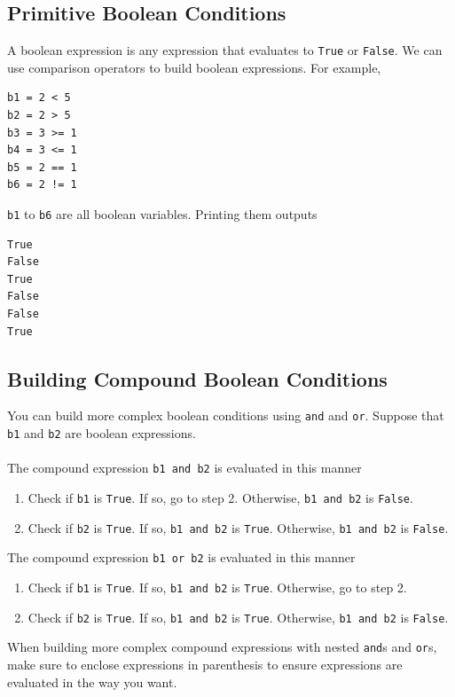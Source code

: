 \documentclass{article}
\begin{document}
\subsection{Primitive Boolean Conditions}
A boolean expression is any expression that evaluates to \texttt{True} or \texttt{\texttt{False}}. We can use comparison operators to build boolean expressions. For example, 
\begin{verbatim}
b1 = 2 < 5
b2 = 2 > 5
b3 = 3 >= 1
b4 = 3 <= 1
b5 = 2 == 1
b6 = 2 != 1
\end{verbatim}
\texttt{b1} to \texttt{b6} are all boolean variables. Printing them outputs
\begin{verbatim}
True
False
True
False
False
True
\end{verbatim}

\subsection{Building Compound Boolean Conditions}
You can build more complex boolean conditions using \texttt{and} and \texttt{or}. Suppose that \texttt{b1} and \texttt{b2} are boolean expressions.\\\\
The compound expression \texttt{b1 and b2} is evaluated in this manner
\begin{enumerate}
    \item Check if \texttt{b1} is \texttt{True}. If so, go to step 2. Otherwise, \texttt{b1 and b2} is \texttt{False}.
    \item Check if \texttt{b2} is \texttt{True}. If so, \texttt{b1 and b2} is \texttt{True}. Otherwise, \texttt{b1 and b2} is \texttt{False}.
\end{enumerate}
The compound expression \texttt{b1 or b2} is evaluated in this manner
\begin{enumerate}
    \item Check if \texttt{b1} is \texttt{True}. If so, \texttt{b1 and b2} is \texttt{True}. Otherwise, go to step 2.
    \item Check if \texttt{b2} is \texttt{True}. If so, \texttt{b1 and b2} is \texttt{True}. Otherwise, \texttt{b1 and b2} is \texttt{\texttt{False}}.
\end{enumerate}
When building more complex compound expressions with nested \texttt{and}s and \texttt{or}s, make sure to enclose expressions in parenthesis to ensure expressions are evaluated in the way you want.\\\\
\end{document}
